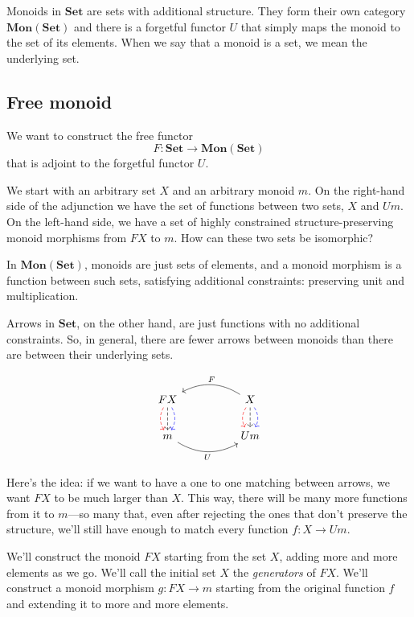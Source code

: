 \documentclass[DaoFP]{subfiles}
\begin{document}
Monoids in $\mathbf{Set}$ are sets with additional structure. They form their own category $\mathbf{Mon}(\mathbf{Set})$ and there is a forgetful functor $U$ that simply maps the monoid to the set of its elements. When we say that a monoid is a set, we mean the underlying set.

\subsection{Free monoid}

We want to construct the free functor 
\[ F \colon \mathbf{Set} \to \mathbf{Mon}(\mathbf{Set})\]
that is adjoint to the forgetful functor $U$. 

We start with an arbitrary set $X$ and an arbitrary monoid $m$. On the right-hand side of the adjunction we have the set of functions between two sets, $X$ and $U m$. On the left-hand side, we have a set of highly constrained structure-preserving monoid morphisms from $F X$ to $m$. How can these two sets be isomorphic?

In  $\mathbf{Mon}(\mathbf{Set})$, monoids are just sets of elements, and a monoid morphism is a function between such sets, satisfying additional constraints: preserving unit and multiplication. 

Arrows in $\mathbf{Set}$, on the other hand, are just functions with no additional constraints. So, in general, there are fewer arrows between monoids than there are between their underlying sets. 

\[
 \begin{tikzcd}
F X
\arrow[d, bend right, red, dashed]
\arrow[d, dashed]
\arrow[d, bend left, blue, dashed]
  &&
X
\arrow[d, bend right, red, dashed]
\arrow[d, dashed]
\arrow[d, bend left, blue, dashed]
 \arrow[ll, bend right, "F"']
 \\
m
   \arrow[rr, bend right, "U"']
 &&
 U m
  \end{tikzcd}
\]

Here's the idea: if we want to have a one to one matching between arrows, we want $F X$ to be much larger than $X$. This way, there will be many more functions from it to $m$---so many that, even after rejecting the ones that don't preserve the structure, we'll still have enough to match every function $f \colon X \to U m$.

We'll construct the monoid $F X$ starting from the set $X$, adding more and more elements as we go. We'll call the initial set $X$ the \emph{generators} of $F X$. We'll construct a monoid morphism $g \colon F X \to m$ starting from the original function $f$ and extending it to more and more elements.
\end{document}
